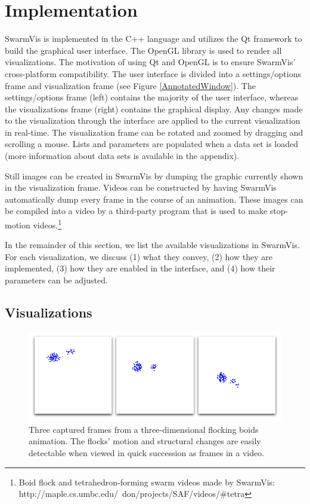 \documentclass{vgtc}
\begin{document}
\section{Implementation}
SwarmVis is implemented in the C++ language and utilizes the Qt framework\cite{Qt:website} to build the graphical user interface.
The OpenGL library is used to render all visualizations.
The motivation of using Qt and OpenGL is to ensure SwarmVis' cross-platform compatibility.
The user interface is divided into a settings/options frame and visualization frame (see Figure \ref{AnnotatedWindow}).
The settings/options frame (left) contains the majority of the user interface,
whereas the visualizations frame (right) contains  the graphical display.
Any changes made to the visualization through the interface are applied to the current visualization in real-time.
The visualization frame can be rotated and zoomed by dragging and scrolling a mouse.
Lists and parameters are populated when a data set is loaded (more information about data sets is available in the appendix).

Still images can be created in SwarmVis by dumping the graphic currently shown in the visualization frame.
Videos can be constructed by having SwarmVis automatically dump every frame in the course of an animation.
These images can be compiled into a video by a third-party program that is used to make stop-motion
videos.\footnote{Boid flock and tetrahedron-forming swarm videos made by SwarmVis:\\
 http://maple.cs.umbc.edu/~don/projects/SAF/videos/\#tetra}

In the remainder of this section, we list the available visualizations in SwarmVis.
For each visualization, we discuss
(1) what they convey,
(2) how they are implemented,
(3) how they are enabled in the interface,
and (4) how their parameters can be adjusted.


\subsection{Visualizations}\label{visualizations}


\begin{figure}
\centering
\includegraphics[scale=.282]{images/animation.png}
\caption{
Three captured frames from a three-dimensional flocking boids\cite{reynolds1987} animation.
The flocks' motion and structural changes are easily detectable when viewed in quick succession as frames in a video.}
\label{Animation}
\end{figure}
\end{document}
